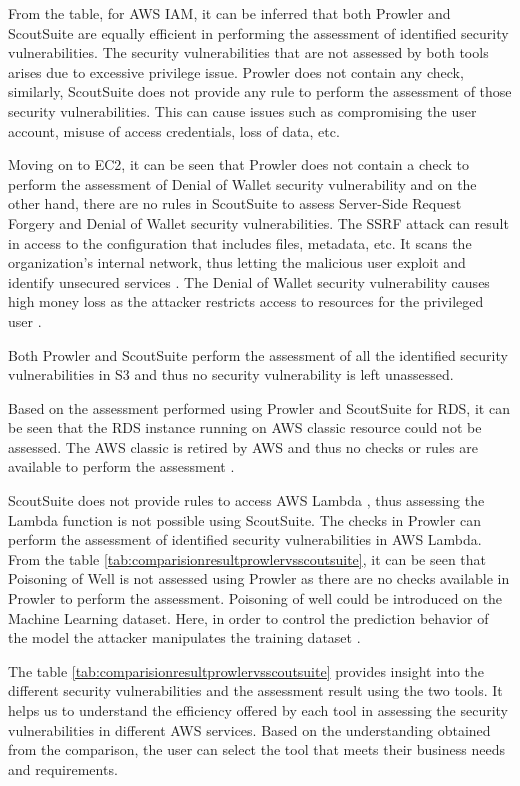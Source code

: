 \par From the table, for AWS IAM, it can be inferred that both Prowler and ScoutSuite are equally efficient in performing the assessment of identified security vulnerabilities.
The security vulnerabilities that are not assessed by both tools arises due to excessive privilege issue.
Prowler does not contain any check, similarly, ScoutSuite does not provide any rule to perform the assessment of those security vulnerabilities.
This can cause issues such as compromising the user account, misuse of access credentials, loss of data, etc.

\par Moving on to EC2, it can be seen that Prowler does not contain a check to perform the assessment of Denial of Wallet security vulnerability and on the other hand, there are no rules in ScoutSuite to assess Server-Side Request Forgery and Denial of Wallet security vulnerabilities.
The SSRF attack can result in access to the configuration that includes files, metadata, etc.
It scans the organization’s internal network, thus letting the malicious user exploit and identify unsecured services \cite{97}.
The Denial of Wallet security vulnerability causes high money loss as the attacker restricts access to resources for the privileged user \cite{86}.

\par Both Prowler and ScoutSuite perform the assessment of all the identified security vulnerabilities in S3 and thus no security vulnerability is left unassessed.

\par Based on the assessment performed using Prowler and ScoutSuite for RDS, it can be seen that the RDS instance running on AWS classic resource could not be assessed.
The AWS classic is retired by AWS and thus no checks or rules are available to perform the assessment \cite{88}.

\par ScoutSuite does not provide rules to access AWS Lambda \cite{72}, thus assessing the Lambda function is not possible using ScoutSuite.
The checks in Prowler can perform the assessment of identified security vulnerabilities in AWS Lambda.
From the table \ref{tab:comparisionresultprowlervsscoutsuite}, it can be seen that Poisoning of Well is
not assessed using Prowler as there are no checks available in Prowler to perform the assessment.
Poisoning of well could be introduced on the Machine
Learning
dataset.
Here, in order to control the prediction behavior of the model the attacker manipulates the training dataset \cite{90}.

\par The table \ref{tab:comparisionresultprowlervsscoutsuite} provides insight into the different security vulnerabilities and the assessment result using the two tools.
It helps us to understand the efficiency offered by each tool in assessing the security vulnerabilities in different AWS services.
Based on the understanding obtained from the comparison, the user can select the tool that meets their business needs and requirements.
